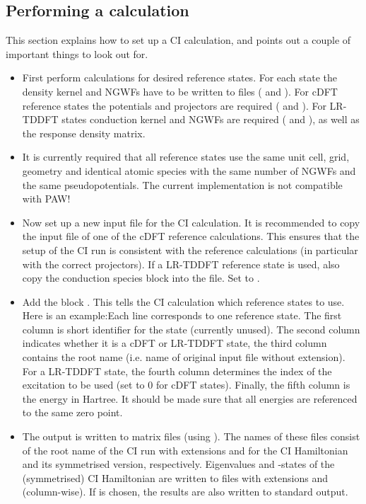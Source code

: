 \documentclass[letterpaper,10pt,english]{sphinxmanual}
\begin{document}
\subsection{Performing a calculation}
\label{\detokenize{ci:performing-a-calculation}}
This section explains how to set up a CI calculation, and points out a
couple of important things to look out for.
\begin{itemize}
\item {} 
First perform calculations for desired reference states. For each
state the density kernel and NGWFs have to be written to files
( and ). For cDFT reference states the
potentials and projectors are required ( and
). For LR-TDDFT states conduction kernel and
NGWFs are required ( and ), as
well as the response density matrix.

\item {} 
It is currently required that all reference states use the same unit
cell, grid, geometry and identical atomic species with the same
number of NGWFs and the same pseudopotentials.  The current
implementation is not compatible with PAW!

\item {} 
Now set up a new input file for the CI calculation. It is recommended
to copy the input file of one of the cDFT reference calculations.
This ensures that the setup of the CI run is consistent with the
reference calculations (in particular with the correct projectors).
If a LR-TDDFT reference state is used, also copy the conduction
species block into the file. Set  to .

\item {} 
Add the block . This tells the CI calculation
which reference states to use. Here is an example:Each line
corresponds to one reference state. The first column is short
identifier for the state (currently unused). The second column
indicates whether it is a cDFT or LR-TDDFT state, the third column
contains the root name (i.e. name of original input file without
extension). For a LR-TDDFT state, the fourth column determines the
index of the excitation to be used (set to 0 for cDFT states).
Finally, the fifth column is the energy in Hartree. It should be made
sure that all energies are referenced to the same zero point.

\item {} 
The output is written to matrix files (using ). The
names of these files consist of the root name of the CI run with
extensions  and  for the CI Hamiltonian and
its symmetrised version, respectively. Eigenvalues and -states of the
(symmetrised) CI Hamiltonian are written to files with extensions
 and  (column-wise). If
 is chosen, the results are also written
to standard output.

\end{itemize}
\end{document}
